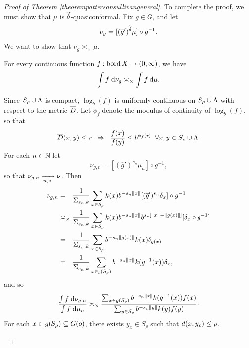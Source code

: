 \begin{proof}[Proof of Theorem \ref{theorempattersonsullivangeneral}]
To complete the proof, we must show that $\mu$ is $\widetilde\delta$-quasiconformal. Fix $g\in G$, and let
\[
\nu_g = [(\overline g')^{\widetilde\delta} \mu] \circ g^{-1}.
\]
We want to show that $\nu_g \asymp_\times\mu$.

\begin{claim}
\label{claimconformalf}
For every continuous function $f:\operatorname{bord} X\to(0,\infty)$, we have
\begin{equation}
\label{conformalf}
\int f\;\mathrm{d} \nu_g \asymp_\times \int f\;\mathrm{d}\mu.
\end{equation}
\end{claim}
\begin{subproof}
Since $S_\rho\cup \Lambda$ is compact, $\log_b(f)$ is uniformly continuous on $S_\rho\cup\Lambda$ with respect to the metric $\overline{D}$. Let $\phi_f$ denote the modulus of continuity of $\log_b(f)$, so that
\begin{equation}
\label{uniformcontinuity}
\overline{D}(x,y) \leq r \;\;\Rightarrow\;\; \frac{f(x)}{f(y)} \leq b^{\phi_f(r)} \;\;\forall x,y\in S_\rho\cup\Lambda.
\end{equation}
For each $n\in\N$ let
\[
\nu_{g,n} = [(\overline g')^{s_n} \mu_n] \circ g^{-1},
\]
so that $\nu_{g,n} \xrightarrow[n,\times]{} \nu$.
Then
\begin{align*}
\nu_{g,n} &=_\pt \frac{1}{\Sigma_{s_n,k}} \sum_{x\in S_\rho} k(x) b^{-s_n \dox x} [(\overline g')^{s_n} \delta_x] \circ g^{-1}\\
&\asymp_\times \frac{1}{\Sigma_{s_n,k}} \sum_{x\in S_\rho} k(x) b^{-s_n \dox x} b^{s_n[\dox x - \dox{g(x)}]} [\delta_x \circ g^{-1}]\\
&=_\pt \frac{1}{\Sigma_{s_n,k}} \sum_{x\in S_\rho} b^{-s_n \dox{g(x)}} k(x) \delta_{g(x)}\\
&=_\pt \frac{1}{\Sigma_{s_n,k}} \sum_{x\in g(S_\rho)} b^{-s_n \dox x} k(g^{-1}(x)) \delta_x,
\end{align*}
and so
\begin{equation}
\label{nugnmun}
\frac{\int f\;\mathrm{d}\nu_{g,n}}{\int f\;\mathrm{d}\mu_n} \asymp_\times \frac{\sum_{x\in g(S_\rho)}b^{-s_n\|x\|} k(g^{-1}(x)) f(x)}{\sum_{y\in S_\rho}b^{-s_n\|y\|} k(y) f(y)}\cdot
\end{equation}
For each $x\in g(S_\rho)\subseteq G(o)$, there exists $y_x\in S_\rho$ such that $d(x,y_x) \leq \rho$.
\begin{observation}

\end{observation}
\end{subproof}
\end{proof}
